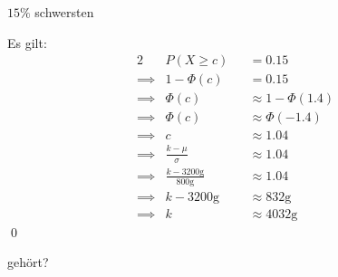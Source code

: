 \documentclass{abgabe}
\begin{document}
\begin{questions}
\begin{parts}
\begin{subparts}
            \newpage
            \subpart
            $15\%$ schwersten
            \begin{solution}
                Es gilt:
                \begin{alignat*}{2}
                             & P(X \geq c)                      &  & = 0.15                \\
                    \implies & 1 - \Phi(c)                      &  & = 0.15                \\
                    \implies & \Phi(c)                          &  & \approx 1 - \Phi(1.4) \\
                    \implies & \Phi(c)                          &  & \approx \Phi(-1.4)    \\
                    \implies & c                                &  & \approx 1.04          \\
                    \implies & \frac{k-\mu}{\sigma}             &  & \approx 1.04          \\
                    \implies & \frac{k-3200\si{\g}}{800\si{\g}} &  & \approx 1.04          \\
                    \implies & k-3200\si{\g}                    &  & \approx 832\si{\g}    \\
                    \implies & k                                &  & \approx 4032\si{\g}
                \end{alignat*}
                \qed
            \end{solution}
        \end{subparts}
        gehört?
    \end{parts}
\end{questions}
\end{document}
